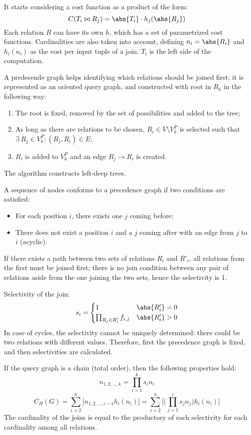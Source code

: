 It starts considering a cost function as a product of the form:
$$C(T_i \bowtie R_j) = \abs{T_i} \cdot h_j(\abs{R_j})$$
Each relation $R$ can have its own $h$, which has a set of parametrized cost functions. Cardinalities are also taken into account, defining $n_i = \abs{R_i}$ and $h_i(n_i)$ as the cost per input tuple of a join. $T_i$ is the left side of the computation.

A predecende graph helps identifying which relations should be joined first; it is represented as an oriented query graph, and constructed with root in $R_k$ in the following way:
\begin{enumerate}
	\item The root is fixed, removed by the set of possibilities and added to the tree;
	\item As long as there are relations to be chosen, $R_i \in V \setminus V_k^P$ is selected such that $\exists\ R_j \in V_k^P : (R_j, R_i) \in E$;
	\item $R_i$ is added to $V_k^P$ and an edge $R_j \rightarrow R_i$ is created.
\end{enumerate}

The algorithm constructs left-deep trees.

A sequence of nodes conforms to a precedence graph if two conditions are satisfied:
\begin{itemize}
	\item For each position $i$, there exists one $j$ coming before;
	\item There does not exist a position $i$ and a $j$ coming after with an edge from $j$ to $i$ (acyclic).
\end{itemize}

If there exists a path between two sets of relations $R_i$ and $R'_i$, all relations from the first must be joined first; there is no join condition between any pair of relations aside from the one joining the two sets, hence the selectivity is 1.

Selectivity of the join:
$$s_i = \begin{cases}
1 & \abs{R_i'} = 0 \\
\prod_{R_j \in R'_i} f_{i, j} & \abs{R'_i} > 0
\end{cases}$$
In case of cycles, the selectivity cannot be uniquely determined: there could be two relations with different values. Therefore, first the precedence graph is fixed, and then selectivities are calculated.

If the query graph is a chain (total order), then the following properties hold:
$$n_{1, 2, \dots, k} = \prod_{i=1}^{k}s_in_i$$
$$C_H(G) = \sum_{i=2}^{n}\big[n_{1, 2, \dots, i-1}h_i(n_i)\big] = \sum_{i=2}^{n}\Big[\Big(\prod_{j=1}^{i}s_jn_j\Big)h_i(n_i)\Big]$$
The cardinality of the joins is equal to the productory of each selectivity for each cardinality among all relations.

